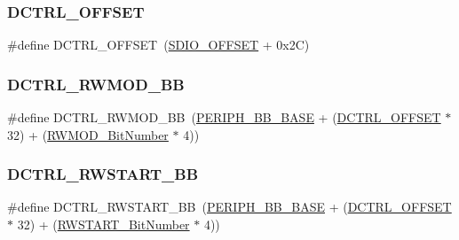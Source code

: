 \mbox{\label{group___s_d_i_o___private___types_definitions_ga948c1382c4cfd3af3e406c4d0cdd4240}} 
\subsubsection{\texorpdfstring{DCTRL\_OFFSET}{DCTRL\_OFFSET}}
{\footnotesize\ttfamily \#define D\+C\+T\+R\+L\+\_\+\+O\+F\+F\+S\+ET~(\mbox{\hyperlink{group___s_d_i_o___private___types_definitions_gabf07aced03df5f46d57cea1d4f56d1e3}{S\+D\+I\+O\+\_\+\+O\+F\+F\+S\+ET}} + 0x2\+C)}

\mbox{\label{group___s_d_i_o___private___types_definitions_gad34bfe8650534ce24320ae83886c91e3}} 
\subsubsection{\texorpdfstring{DCTRL\_RWMOD\_BB}{DCTRL\_RWMOD\_BB}}
{\footnotesize\ttfamily \#define D\+C\+T\+R\+L\+\_\+\+R\+W\+M\+O\+D\+\_\+\+BB~(\mbox{\hyperlink{group___peripheral__memory__map_gaed7efc100877000845c236ccdc9e144a}{P\+E\+R\+I\+P\+H\+\_\+\+B\+B\+\_\+\+B\+A\+SE}} + (\mbox{\hyperlink{group___s_d_i_o___private___types_definitions_ga948c1382c4cfd3af3e406c4d0cdd4240}{D\+C\+T\+R\+L\+\_\+\+O\+F\+F\+S\+ET}} $\ast$ 32) + (\mbox{\hyperlink{group___s_d_i_o___private___types_definitions_gad7b722671f65e79d1be2899b643278ad}{R\+W\+M\+O\+D\+\_\+\+Bit\+Number}} $\ast$ 4))}

\mbox{\label{group___s_d_i_o___private___types_definitions_gac776c39dfac0e1ed007217133e1145c3}} 
\subsubsection{\texorpdfstring{DCTRL\_RWSTART\_BB}{DCTRL\_RWSTART\_BB}}
{\footnotesize\ttfamily \#define D\+C\+T\+R\+L\+\_\+\+R\+W\+S\+T\+A\+R\+T\+\_\+\+BB~(\mbox{\hyperlink{group___peripheral__memory__map_gaed7efc100877000845c236ccdc9e144a}{P\+E\+R\+I\+P\+H\+\_\+\+B\+B\+\_\+\+B\+A\+SE}} + (\mbox{\hyperlink{group___s_d_i_o___private___types_definitions_ga948c1382c4cfd3af3e406c4d0cdd4240}{D\+C\+T\+R\+L\+\_\+\+O\+F\+F\+S\+ET}} $\ast$ 32) + (\mbox{\hyperlink{group___s_d_i_o___private___types_definitions_ga773045c51d3e8daee0c181517c44a2df}{R\+W\+S\+T\+A\+R\+T\+\_\+\+Bit\+Number}} $\ast$ 4))}

